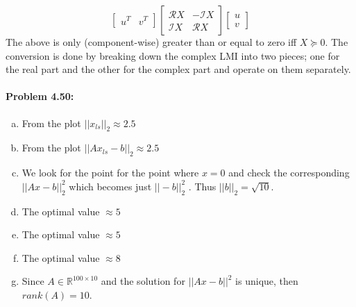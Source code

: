 \documentclass[12pt] {article}
\begin{document}
\[
\left[
\begin{array}{cc}
u^{T} & v^{T}
\end{array} 
\right]
\left[
\begin{array}{cc}
\mathscr{R}X & -\mathscr{I}X\\
\mathscr{I}X & \mathscr{R}X
\end{array} 
\right]
\left[
\begin{array}{c}
u\\
v
\end{array} 
\right]
\]
The above is only (component-wise) greater than or equal to zero iff $X\succeq 0$. The conversion is done by breaking down the complex LMI into two pieces; one for the real part and the other for the complex part and operate on them separately. 
\paragraph{Problem 4.50:} 
\begin{enumerate}[(a)]
\item From the plot $||x_{ls}||_{2} \approx 2.5$
\item From the plot $||Ax_{ls} - b||_{2} \approx 2.5$
\item We look for the point for the point where $x=0$ and check the corresponding $||Ax-b||^{2}_{2}$ which becomes just $||-b||^{2}_{2}$ . Thus $||b||_2=\sqrt{10}$.
\item The optimal value $\approx 5$
\item The optimal value $\approx 5$
\item The optimal value $\approx 8$
\item Since $A\in \mathbb{R}^{100\times 10}$ and the solution for $||Ax-b||^{2}$ is unique, then $rank(A)=10$.
\end{enumerate}
 

\end{document}
